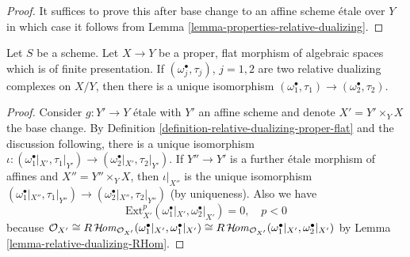 \begin{proof}
It suffices to prove this after base change to an affine scheme \'etale
over $Y$ in which case it follows from
Lemma \ref{lemma-properties-relative-dualizing}.
\end{proof}

\begin{lemma}
\label{lemma-uniqueness-relative-dualizing}
Let $S$ be a scheme. Let $X \to Y$ be a proper, flat morphism of
algebraic spaces which is of finite presentation.
If $(\omega_j^\bullet, \tau_j)$, $j = 1, 2$
are two relative dualizing complexes on $X/Y$,
then there is a unique isomorphism
$(\omega_1^\bullet, \tau_1) \to (\omega_2^\bullet, \tau_2)$.
\end{lemma}

\begin{proof}
Consider $g : Y' \to Y$ \'etale with $Y'$ an affine scheme
and denote $X' = Y' \times_Y X$ the base change.
By Definition \ref{definition-relative-dualizing-proper-flat}
and the discussion following, there is a unique isomorphism
$\iota : (\omega_1^\bullet|_{X'}, \tau_1|_{Y'}) \to
(\omega_2^\bullet|_{X'}, \tau_2|_{Y'})$. If $Y'' \to Y'$
is a further \'etale morphism of affines and $X'' = Y'' \times_Y X$,
then $\iota|_{X''}$ is the unique isomorphism
$(\omega_1^\bullet|_{X''}, \tau_1|_{Y''}) \to
(\omega_2^\bullet|_{X''}, \tau_2|_{Y''})$ (by uniqueness).
Also we have
$$
\text{Ext}^p_{X'}(\omega_1^\bullet|_{X'}, \omega_2^\bullet|_{X'}) = 0,
\quad p < 0
$$
because
$\mathcal{O}_{X'} \cong
R\mathop{\mathcal{H}\!\mathit{om}}\nolimits_{\mathcal{O}_{X'}}(\omega_1^\bullet|_{X'}, \omega_1^\bullet|_{X'})
\cong
R\mathop{\mathcal{H}\!\mathit{om}}\nolimits_{\mathcal{O}_{X'}}(\omega_1^\bullet|_{X'}, \omega_2^\bullet|_{X'})$
by Lemma \ref{lemma-relative-dualizing-RHom}.


\end{proof}
